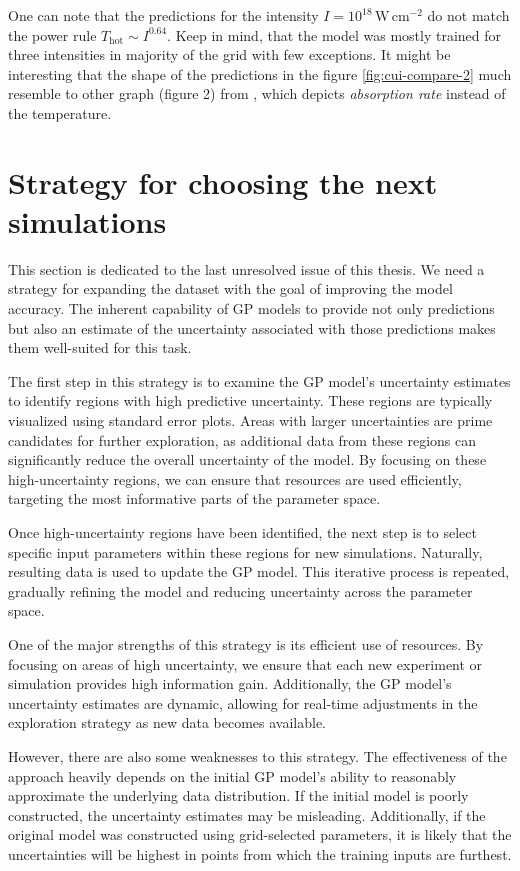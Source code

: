 One can note that the predictions for the intensity $I = 10^{18} \, \mathrm{W} \, \mathrm{cm}^{-2}$ do not match the power rule $T_\mathrm{hot} \sim I^{0.64}$. Keep in mind, that the model was mostly trained for three intensities in majority of the grid with few exceptions. It might be interesting that the shape of the predictions in the figure \ref{fig:cui-compare-2} much resemble to other graph (figure 2) from \cite{cui2013}, which depicts \textit{absorption rate} instead of the temperature. 

\section{Strategy for choosing the next simulations}

This section is dedicated to the last unresolved issue of this thesis. We need a strategy for expanding the dataset with the goal of improving the model accuracy. The inherent capability of GP models to provide not only predictions but also an estimate of the uncertainty associated with those predictions makes them well-suited for this task.

The first step in this strategy is to examine the GP model's uncertainty estimates to identify regions with high predictive uncertainty. These regions are typically visualized using standard error plots. Areas with larger uncertainties are prime candidates for further exploration, as additional data from these regions can significantly reduce the overall uncertainty of the model. By focusing on these high-uncertainty regions, we can ensure that resources are used efficiently, targeting the most informative parts of the parameter space.

Once high-uncertainty regions have been identified, the next step is to select specific input parameters within these regions for new simulations. Naturally, resulting data is used to update the GP model. This iterative process is repeated, gradually refining the model and reducing uncertainty across the parameter space.

One of the major strengths of this strategy is its efficient use of resources. By focusing on areas of high uncertainty, we ensure that each new experiment or simulation provides high information gain. Additionally, the GP model's uncertainty estimates are dynamic, allowing for real-time adjustments in the exploration strategy as new data becomes available. 

However, there are also some weaknesses to this strategy. The effectiveness of the approach heavily depends on the initial GP model's ability to reasonably approximate the underlying data distribution. If the initial model is poorly constructed, the uncertainty estimates may be misleading. Additionally, if the original model was constructed using grid-selected parameters, it is likely that the uncertainties will be highest in points from which the training inputs are furthest.

